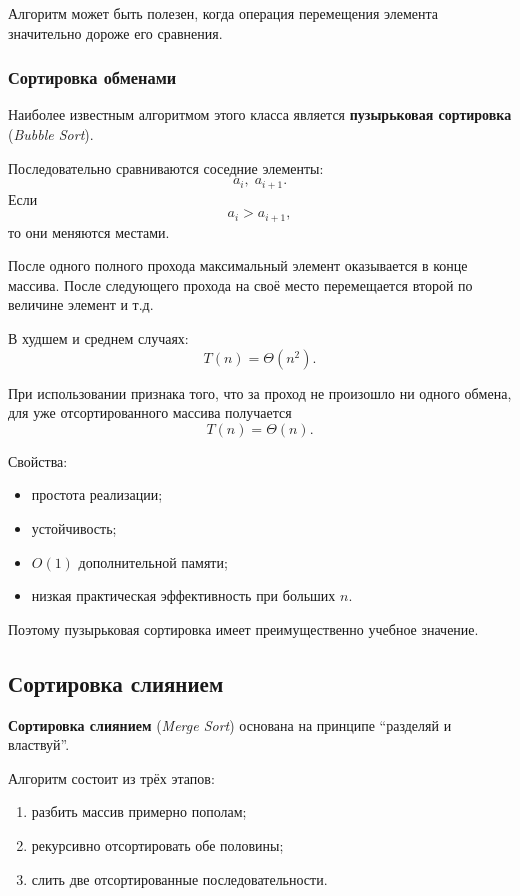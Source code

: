Алгоритм может быть полезен, когда операция перемещения элемента значительно
дороже его сравнения.


\subsubsection*{Сортировка обменами}

Наиболее известным алгоритмом этого класса является
\textbf{пузырьковая сортировка} (\textit{Bubble Sort}).

Последовательно сравниваются соседние элементы:
\[
a_i,\;a_{i+1}.
\]
Если
\[
a_i>a_{i+1},
\]
то они меняются местами.

После одного полного прохода максимальный элемент оказывается в конце
массива. После следующего прохода на своё место перемещается второй по
величине элемент и т.д.

В худшем и среднем случаях:
\[
T(n)=\Theta(n^2).
\]

При использовании признака того, что за проход не произошло ни одного
обмена, для уже отсортированного массива получается
\[
T(n)=\Theta(n).
\]

Свойства:
\begin{itemize}
	\item простота реализации;
	\item устойчивость;
	\item $O(1)$ дополнительной памяти;
	\item низкая практическая эффективность при больших $n$.
\end{itemize}

Поэтому пузырьковая сортировка имеет преимущественно учебное значение.


\subsection{Сортировка слиянием}

\textbf{Сортировка слиянием} (\textit{Merge Sort}) основана на принципе
``разделяй и властвуй''.

Алгоритм состоит из трёх этапов:

\begin{enumerate}
	\item разбить массив примерно пополам;
	\item рекурсивно отсортировать обе половины;
	\item слить две отсортированные последовательности.
\end{enumerate}

